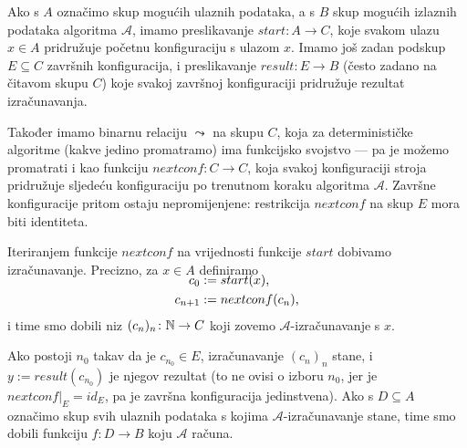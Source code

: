 Ako s $A$ označimo skup mogućih ulaznih podataka, a s $B$ skup mogućih izlaznih podataka algoritma $\mathcal A$, imamo preslikavanje $start\colon A\to C$, koje svakom ulazu $x\in A$ pridružuje početnu konfiguraciju s ulazom $x$. Imamo još zadan podskup $E\subseteq C$ završnih konfiguracija, i preslikavanje $result\colon E\to B$ (često zadano na čitavom skupu $C$) koje svakoj završnoj konfiguraciji pridružuje rezultat izračunavanja.

Također imamo binarnu relaciju $\leadsto$ na skupu $C$, koja za determinističke algoritme (kakve jedino promatramo) ima funkcijsko svojstvo --- pa je možemo promatrati i kao funkciju $nextconf\colon C\to C$, koja svakoj konfiguraciji stroja pridružuje sljedeću konfiguraciju po trenutnom koraku algoritma $\mathcal A$. Završne konfiguracije pritom ostaju nepromijenjene: restrikcija $nextconf$ na skup $E$ mora biti identiteta.

Iteriranjem funkcije $nextconf$ na vrijednosti funkcije $start$ dobivamo izračunavanje. Precizno, za $x\in A$ definiramo
\begin{align}
\SwapAboveDisplaySkip
    c_0&:=start(x)\text,\\
    c_{n+1}&:=nextconf(c_n)\text,
\end{align}
i time smo dobili niz $(c_n)_n\colon{\mathbb N}\to C$ koji zovemo $\mathcal A$-izračunavanje s $x$.

Ako postoji $n_0$ takav da je $c_{n_0}\in E$, izračunavanje $(c_n)_n$ stane, i $y:=result(c_{n_0})$ je njegov rezultat (to ne ovisi o izboru $n_0$, jer je $nextconf|_E=id_E$, pa je završna konfiguracija jedinstvena). Ako s $D\subseteq A$ označimo skup svih ulaznih podataka s kojima $\mathcal A$-izračunavanje stane, time smo dobili funkciju $f\colon D\to B$ koju $\mathcal A$ računa.
\vspace{-5mm}

